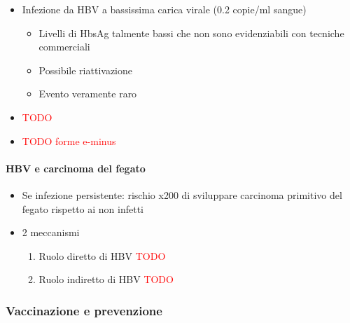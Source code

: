 \documentclass[italian,]{article}
\providecommand{\tightlist}{%
  \setlength{\itemsep}{0pt}\setlength{\parskip}{0pt}}
\newcommand{\TODO}[1]{\textcolor{red}{\textsf{\footnotesize{TODO #1}}}} %
\begin{document}
\begin{itemize}
\item
  Infezione da HBV a bassissima carica virale (0.2 copie/ml sangue)

  \begin{itemize}
  \tightlist
  \item
    Livelli di HbsAg talmente bassi che non sono evidenziabili con
    tecniche commerciali
  \item
    Possibile riattivazione
  \item
    Evento veramente raro
  \end{itemize}
\item
  \TODO{}
\item
  \TODO{forme e-minus}
\end{itemize}

\hypertarget{hbv-e-carcinoma-del-fegato}{%
\paragraph{HBV e carcinoma del
fegato}\label{hbv-e-carcinoma-del-fegato}}

\begin{itemize}
\tightlist
\item
  Se infezione persistente: rischio x200 di sviluppare carcinoma
  primitivo del fegato rispetto ai non infetti
\item
  2 meccanismi

  \begin{enumerate}
  \def\labelenumi{\arabic{enumi}.}
  \tightlist
  \item
    Ruolo diretto di HBV \TODO{}
  \item
    Ruolo indiretto di HBV \TODO{}
  \end{enumerate}
\end{itemize}

\hypertarget{vaccinazione-e-prevenzione}{%
\subsubsection{Vaccinazione e
prevenzione}\label{vaccinazione-e-prevenzione}}
\end{document}
